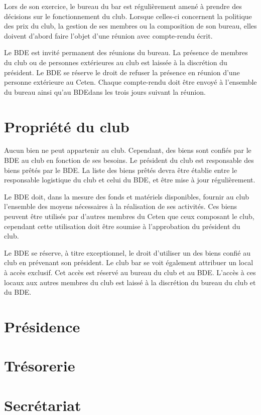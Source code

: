 \documentclass{article} %
\begin{document}
\begin{multicols}{2}
		{\small
		
			Lors de son exercice, le bureau du bar est régulièrement amené à
			prendre des décisions sur le fonctionnement du club. Lorsque
			celles-ci concernent la politique des prix du club, la gestion de
			ses membres ou la composition de son bureau, elles doivent d'abord
			faire l'objet d'une réunion avec compte-rendu écrit.

			Le BDE est invité permanent des réunions du bureau. La présence de
			membres du club ou de personnes extérieures au club est laissée à la
			discrétion du président. Le BDE se réserve le droit de refuser la
			présence en réunion d'une personne extérieure au Ceten. Chaque
			compte-rendu doit être envoyé à l'ensemble du bureau ainsi qu'au
			BDE\@ dans les trois jours suivant la réunion.
		
		}

		\section{Propriété du club}
\label{sec:propriete}
		
		{\small
		
			Aucun bien ne peut appartenir au club. Cependant, des biens sont
			confiés par le BDE au club en fonction de ses besoins. Le président
			du club est responsable des biens prêtés par le BDE\@. La liste des
			biens prêtés devra être établie entre le responsable logistique du
			club et celui du BDE, et être mise à jour régulièrement.

			Le BDE doit, dans la mesure des fonds et matériels disponibles,
			fournir au club l’ensemble des moyens nécessaires à la réalisation
			de ses activités. Ces biens peuvent être utilisés par d’autres
			membres du Ceten que ceux composant le club, cependant cette
			utilisation doit être soumise à l’approbation du président du club.

			Le BDE se réserve, à titre exceptionnel, le droit d’utiliser un des
			biens confié au club en prévenant son président. Le club bar se voit
			également attribuer un local à accès exclusif. Cet accès est réservé
			au bureau du club et au BDE\@. L’accès à ces locaux aux autres
			membres du club est laissé à la discrétion du bureau du club et du
			BDE\@.
			
		}

		\section{Présidence}
\label{sec:presidence}

		\section{Trésorerie}
\label{sec:tresorerie}

		\section{Secrétariat}
\label{sec:secretariat}

	\end{multicols}
\end{document}
